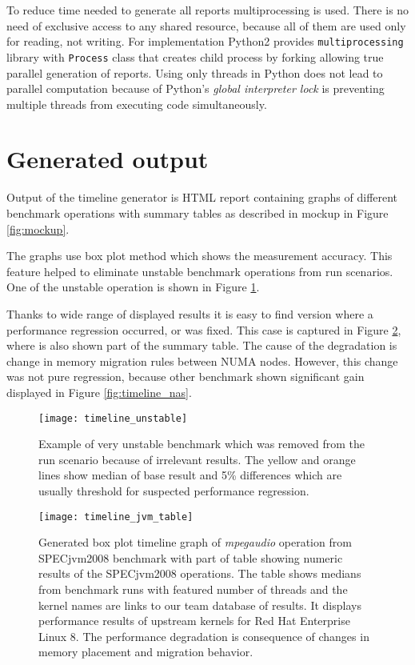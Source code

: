 To reduce time needed to generate all reports multiprocessing is used. There is
no need of exclusive access to any shared resource, because all of them are
used only for reading, not writing. For implementation Python2 provides
\texttt{multiprocessing} library with \texttt{Process} class that creates child
process by forking allowing true parallel generation of reports. Using only
threads in Python does not lead to parallel computation because of Python's
\emph{global interpreter lock} is preventing multiple threads from executing
code simultaneously.

\section{Generated output}
Output of the timeline generator is HTML report containing graphs of different
benchmark operations with summary tables as described in mockup in Figure
\ref{fig:mockup}.

The graphs use box plot method which shows the measurement accuracy. This
feature helped to eliminate unstable benchmark operations from run scenarios.
One of the unstable operation is shown in Figure \ref{fig:timeline_unstable}.

Thanks to wide range of displayed results it is easy to find version where a
performance regression occurred, or was fixed. This case is captured in Figure
\ref{fig:timeline_jvm_table}, where is also shown part of the summary table. The
cause of the degradation is change in memory migration rules between NUMA nodes.
However, this change was not pure regression, because other benchmark shown
significant gain displayed in Figure \ref{fig:timeline_nas}. 

\begin{figure}
  \centering
  \texttt{[image: timeline\_unstable]}
  \caption{Example of very unstable benchmark which was removed from the run
    scenario because of irrelevant results. The yellow and orange lines show
    median of base result and 5\% differences which are usually threshold for
    suspected performance regression.}
  \label{fig:timeline_unstable}
\end{figure}

\begin{figure}
  \centering
  \texttt{[image: timeline\_jvm\_table]}
  \caption{Generated box plot timeline graph of \emph{mpegaudio} operation from
    SPECjvm2008 benchmark with part of table showing numeric results of the
    SPECjvm2008 operations. The table shows medians from benchmark runs with
    featured number of threads and the kernel names are links to our team
    database of results. It displays performance results of upstream kernels for
    Red Hat Enterprise Linux 8. The performance degradation is consequence of
    changes in memory placement and migration behavior.}
  \label{fig:timeline_jvm_table}
\end{figure}

